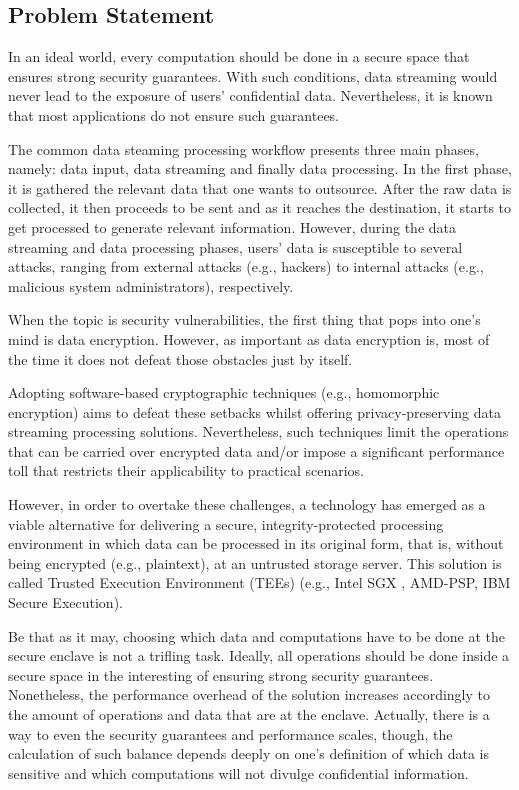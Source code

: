 
\subsection{Problem Statement}\label{s:problem}
In an ideal world, every computation should be done in a secure space that ensures strong security guarantees. With such conditions, data streaming would never lead to the exposure of users' confidential data. Nevertheless, it is known that most applications do not ensure such guarantees. 

The common data steaming processing workflow presents three main phases, namely: data input, data streaming and finally data processing. In the first phase, it is gathered the relevant data that one wants to outsource. After the raw data is collected, it then proceeds to be sent and as it reaches the destination, it starts to get processed to generate relevant information. However, during the data streaming and data processing phases, users’ data is susceptible to several attacks, ranging from external attacks (e.g., hackers) to internal attacks (e.g., malicious system administrators), respectively.

When the topic is security vulnerabilities, the first thing that pops into one's mind is data encryption. However, as important as data encryption is, most of the time it does not defeat those obstacles just by itself.

Adopting software-based cryptographic techniques (e.g., homomorphic encryption) aims to defeat these setbacks whilst offering privacy-preserving data streaming processing solutions. Nevertheless, such techniques limit the operations that can be carried over encrypted data and/or impose a significant performance toll that restricts their applicability to practical scenarios. \cite{soteria}

However, in order to overtake these challenges, a technology has emerged as a viable alternative for delivering a secure, integrity-protected processing environment in which data can be processed in its original form, that is, without being encrypted (e.g., plaintext), at an untrusted storage server.\cite{7345265} This solution is called Trusted Execution Environment (TEEs) (e.g., Intel SGX \cite{sgxdocs, intelsgxexplained}, AMD-PSP, IBM Secure Execution).

Be that as it may, choosing which data and computations have to be done at the secure enclave is not a trifling task. Ideally, all operations should be done inside a secure space in the interesting of ensuring strong security guarantees. Nonetheless, the performance overhead of the solution increases accordingly to the amount of operations and data that are at the enclave. Actually, there is a way to even the security guarantees and performance scales, though, the calculation of such balance depends deeply on one's definition of which data is sensitive and which computations will not divulge confidential information.


